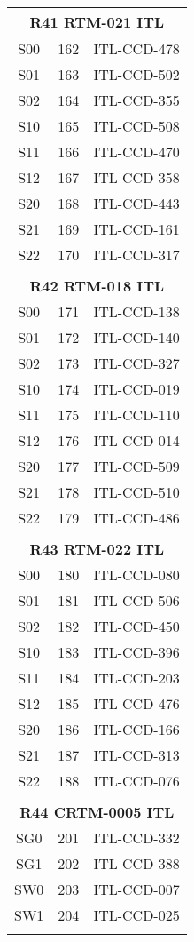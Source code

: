 \begin{longtable}{ccc}
\multicolumn{3}{c}{\bf R41  RTM-021  ITL} \\
\hline
  S00 & 162 & ITL-CCD-478 \\
  S01 & 163 & ITL-CCD-502 \\
  S02 & 164 & ITL-CCD-355 \\
  S10 & 165 & ITL-CCD-508 \\
  S11 & 166 & ITL-CCD-470 \\
  S12 & 167 & ITL-CCD-358 \\
  S20 & 168 & ITL-CCD-443 \\
  S21 & 169 & ITL-CCD-161 \\
  S22 & 170 & ITL-CCD-317 \\
 & & \\
\multicolumn{3}{c}{\bf R42  RTM-018  ITL} \\
\hline
  S00 & 171 & ITL-CCD-138 \\
  S01 & 172 & ITL-CCD-140 \\
  S02 & 173 & ITL-CCD-327 \\
  S10 & 174 & ITL-CCD-019 \\
  S11 & 175 & ITL-CCD-110 \\
  S12 & 176 & ITL-CCD-014 \\
  S20 & 177 & ITL-CCD-509 \\
  S21 & 178 & ITL-CCD-510 \\
  S22 & 179 & ITL-CCD-486 \\
 & & \\
\multicolumn{3}{c}{\bf R43  RTM-022  ITL} \\
\hline
  S00 & 180 & ITL-CCD-080 \\
  S01 & 181 & ITL-CCD-506 \\
  S02 & 182 & ITL-CCD-450 \\
  S10 & 183 & ITL-CCD-396 \\
  S11 & 184 & ITL-CCD-203 \\
  S12 & 185 & ITL-CCD-476 \\
  S20 & 186 & ITL-CCD-166 \\
  S21 & 187 & ITL-CCD-313 \\
  S22 & 188 & ITL-CCD-076 \\
 & & \\
\multicolumn{3}{c}{\bf R44  CRTM-0005  ITL} \\
\hline
  SG0 & 201 & ITL-CCD-332 \\
  SG1 & 202 & ITL-CCD-388 \\
  SW0 & 203 & ITL-CCD-007 \\
  SW1 & 204 & ITL-CCD-025 \\
 & & \\


\end{longtable}
